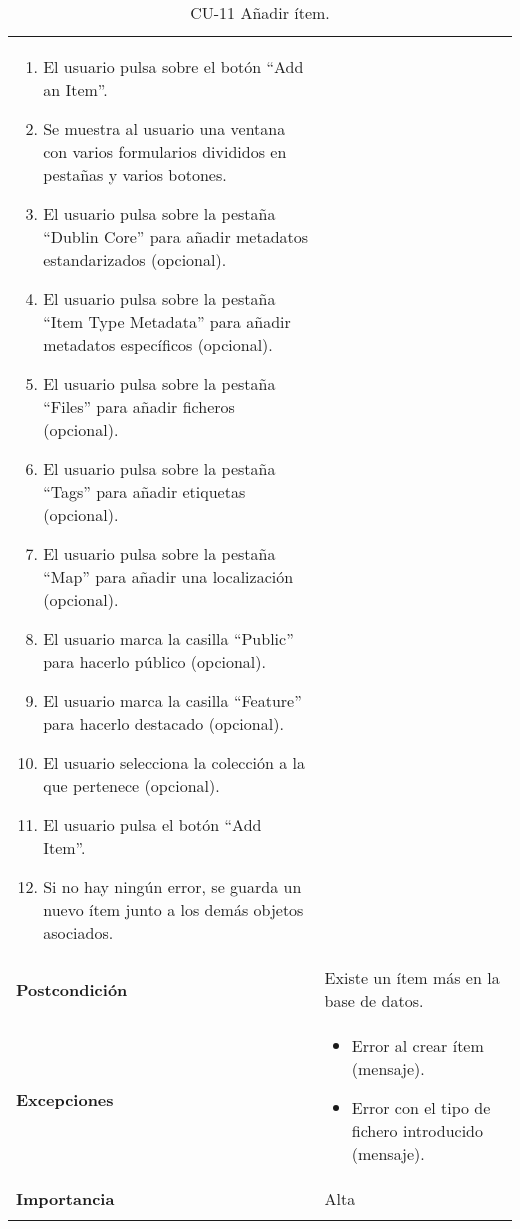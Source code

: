 \begin{longtable}[]{@{}ll@{}}
\begin{minipage}[t]{0.79\columnwidth}
\begin{enumerate}
\tightlist
\item
  El usuario pulsa sobre el botón ``Add an Item''.
\item
  Se muestra al usuario una ventana con varios formularios divididos en
  pestañas y varios botones.
\item
  El usuario pulsa sobre la pestaña ``Dublin Core'' para añadir metadatos
  estandarizados (opcional).
\item
  El usuario pulsa sobre la pestaña ``Item Type Metadata'' para añadir
  metadatos específicos (opcional).
\item
  El usuario pulsa sobre la pestaña ``Files'' para añadir ficheros
  (opcional).
\item
  El usuario pulsa sobre la pestaña ``Tags'' para añadir etiquetas
  (opcional).
\item
  El usuario pulsa sobre la pestaña ``Map'' para añadir una localización
  (opcional).
\item
  El usuario marca la casilla ``Public'' para hacerlo público (opcional).
\item
  El usuario marca la casilla ``Feature'' para hacerlo destacado
  (opcional).
\item
  El usuario selecciona la colección a la que pertenece (opcional).
\item
  El usuario pulsa el botón ``Add Item''.
\item
  Si no hay ningún error, se guarda un nuevo ítem junto a los demás objetos asociados.
  
\end{enumerate}\strut
\end{minipage}\tabularnewline
\begin{minipage}[t]{0.15\columnwidth}\raggedright
\textbf{Postcondición}\strut
\end{minipage} & \begin{minipage}[t]{0.79\columnwidth}\raggedright
Existe un ítem más en la base de datos.\strut
\end{minipage}\tabularnewline
\begin{minipage}[t]{0.15\columnwidth}\raggedright
\textbf{Excepciones}\strut
\end{minipage} & \begin{minipage}[t]{0.79\columnwidth}\raggedright
\begin{itemize}
\tightlist
\item
  Error al crear ítem (mensaje).
\item
  Error con el tipo de fichero introducido (mensaje).
\end{itemize}\strut
\end{minipage}\tabularnewline
\begin{minipage}[t]{0.15\columnwidth}\raggedright
\textbf{Importancia}\strut
\end{minipage} & \begin{minipage}[t]{0.79\columnwidth}\raggedright
Alta\strut
\end{minipage}\tabularnewline
\bottomrule
\caption{CU-11 Añadir ítem.}
\end{longtable}

